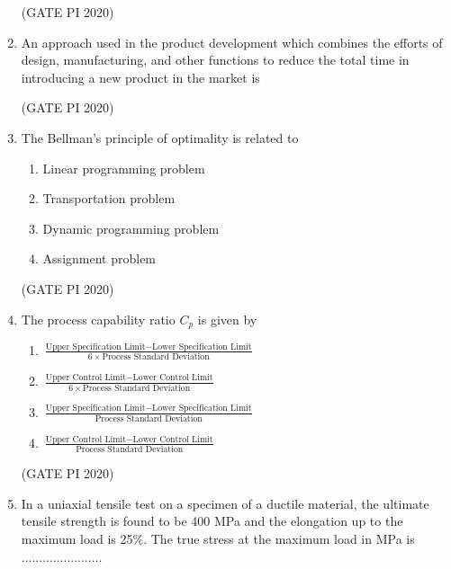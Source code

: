 \documentclass[journal,12pt,onecolumn]{IEEEtran}
\theoremstyle{remark}
\begin{document}
\begin{enumerate}
\hfill (GATE PI 2020)

\item An approach used in the product development which combines the efforts of design, manufacturing, and other functions to reduce the total time in introducing a new product in the market is
\begin{enumerate}
\end{enumerate}

\hfill (GATE PI 2020)

\item The Bellman's principle of optimality is related to
\begin{enumerate}
    \item Linear programming problem
    \item Transportation problem
    \item Dynamic programming problem
    \item Assignment problem
\end{enumerate}

\hfill (GATE PI 2020)

\item The process capability ratio $C_p$ is given by 

\begin{enumerate}
\setlength{\itemsep}{1em}
\item $\frac{\text{Upper Specification Limit} - \text{Lower Specification Limit}}{6 \times \text{Process Standard Deviation}}$
\item $\frac{\text{Upper Control Limit} - \text{Lower Control Limit}}{6 \times \text{Process Standard Deviation}}$
\item $\frac{\text{Upper Specification Limit} - \text{Lower Specification Limit}}{\text{Process Standard Deviation}}$
\item $\frac{\text{Upper Control Limit} - \text{Lower Control Limit}}{\text{Process Standard Deviation}}$
\end{enumerate}

\hfill (GATE PI 2020)

\item In a uniaxial tensile test on a specimen of a ductile material, the ultimate tensile strength is found to be 400 MPa and the elongation up to the maximum load is 25\%. The true stress at the maximum load in MPa is .......................


\end{enumerate}
\end{document}
